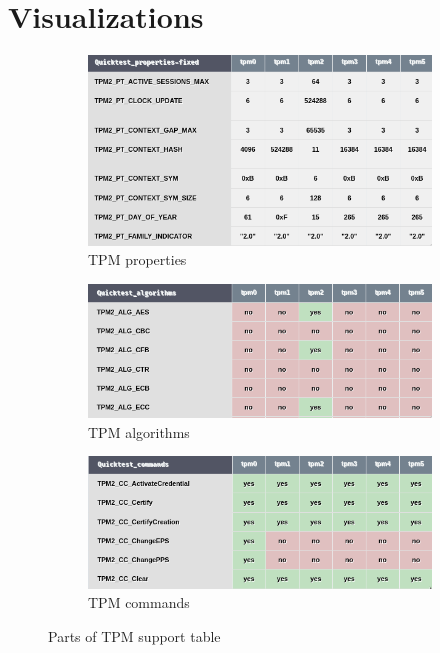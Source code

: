 \renewcommand{\thechapter}{B}
\chapter{Visualizations}\label{appendix:diagrams-visualizations}

\begin{figure}[ht]
  \centering
  \begin{subfigure}{\linewidth}
    \centering
    \includegraphics[width=.8\linewidth]{img/visualizations/tpm-support-properties.png}
    \caption{TPM properties}
  \end{subfigure}
  
  \begin{subfigure}{\linewidth}
    \centering
    \includegraphics[width=.8\linewidth]{img/visualizations/tpm-support-algorithms.png}
    \caption{TPM algorithms}
  \end{subfigure}  

  \begin{subfigure}{\linewidth}
    \centering
    \includegraphics[width=.8\linewidth]{img/visualizations/tpm-support-commands.png}
    \caption{TPM commands}
  \end{subfigure}  
  \caption{Parts of TPM support table}  
\end{figure} 


